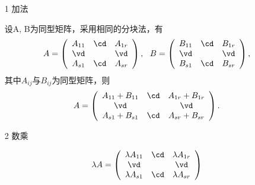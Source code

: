 \begin{frame}
  \begin{overprint}
    \begin{center}
    \end{center}
  \end{overprint}

  \begin{overprint}
    \begin{itemize}
    \item[1] 
      加法
    \item[]
      设A, B为同型矩阵，采用相同的分块法，有
      $$
      A = \left(
      \begin{array}{ccc}
        A_{11} & \cd & A_{1r} \\
        \vd   &     & \vd   \\
        A_{s1} & \cd & A_{sr}
      \end{array}
      \right), \ \ 
      B = \left(
      \begin{array}{ccc}
        B_{11} & \cd & B_{1r} \\
        \vd   &     & \vd   \\
        B_{s1} & \cd & B_{sr}
      \end{array}
      \right),
      $$
      其中$A_{ij}$与$B_{ij}$为同型矩阵，则
      $$
      A = \left(
      \begin{array}{ccc}
        A_{11} + B_{11}  & \cd & A_{1r} + B_{1r} \\
        \vd   &     & \vd   \\
        A_{s1} + B_{s1}  & \cd & A_{sr} + B_{sr}
      \end{array}
      \right).
      $$
    \end{itemize}

    \begin{itemize}
    \item[2] 
      数乘
    \item[]
      $$
      \lambda A = \left(
      \begin{array}{ccc}
        \lambda A_{11} & \cd & \lambda A_{1r} \\
        \vd   &     & \vd   \\
        \lambda A_{s1} & \cd & \lambda A_{sr}
      \end{array}
      \right)
      $$    
    \end{itemize}



\end{overprint}
\end{frame}
